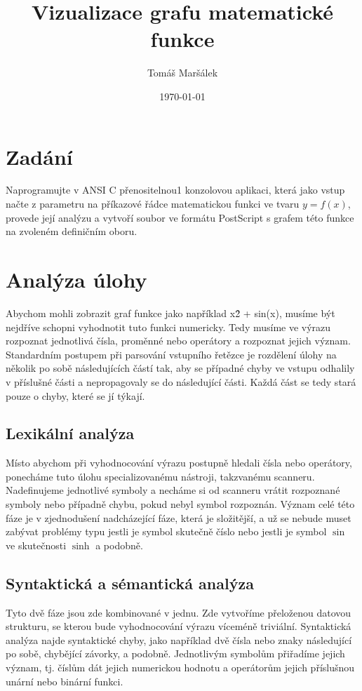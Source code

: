 \documentclass[11pt]{article}
\title{Vizualizace grafu matematické funkce}
\author{Tomáš Maršálek}
\date{\today}
\begin{document}
\maketitle

\section{Zadání}
Naprogramujte v ANSI C přenositelnou1 konzolovou aplikaci, která jako vstup
načte z parametru na příkazové řádce matematickou funkci ve tvaru $y = f(x)$,
provede její analýzu a vytvoří soubor ve formátu PostScript s grafem této
funkce na zvoleném definičním oboru.

\section{Analýza úlohy}
Abychom mohli zobrazit graf funkce jako například x\^2 + sin(x), musíme být
nejdříve schopni vyhodnotit tuto funkci numericky. Tedy musíme ve výrazu
rozpoznat jednotlivá čísla, proměnné nebo operátory a rozpoznat jejich význam.
Standardním postupem při parsování vstupního řetězce je rozdělení úlohy na
několik po sobě následujících částí tak, aby se případné chyby ve vstupu
odhalily v příslušné části a nepropagovaly se do následující části. Každá část
se tedy stará pouze o chyby, které se jí týkají.

\subsection{Lexikální analýza}
Místo abychom při vyhodnocování výrazu postupně hledali čísla nebo operátory,
ponecháme tuto úlohu specializovanému nástroji, takzvanému scanneru.
Nadefinujeme jednotlivé symboly a necháme si od scanneru vrátit rozpoznané
symboly nebo případně chybu, pokud nebyl symbol rozpoznán. Význam celé této
fáze je v zjednodušení nadcházející fáze, která je složitější, a už se nebude
muset zabývat problémy typu jestli je symbol skutečně číslo nebo jestli je
symbol $\sin$ ve skutečnosti $\sinh$ a podobně.

\subsection{Syntaktická a sémantická analýza}
Tyto dvě fáze jsou zde kombinované v jednu. Zde vytvoříme přeloženou datovou
strukturu, se kterou bude vyhodnocování výrazu víceméně triviální. Syntaktická
analýza najde syntaktické chyby, jako například dvě čísla nebo znaky
následující po sobě, chybějící závorky, a podobně. Jednotlivým symbolům přiřadíme jejich význam, tj. číslům dát jejich numerickou hodnotu a operátorům 
jejich příslušnou unární nebo binární funkci. 
\end{document}

